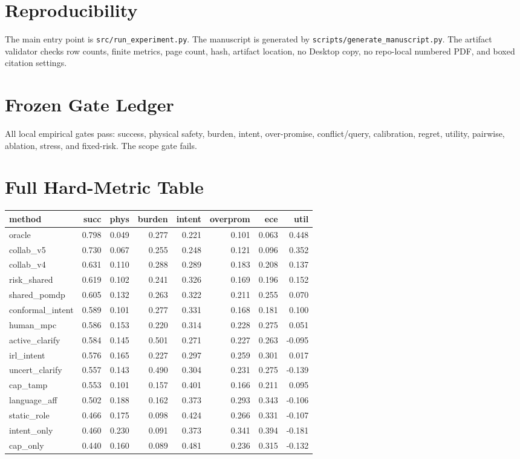 \documentclass{article}
\begin{document}
\section{Reproducibility}
The main entry point is \texttt{src/run\_experiment.py}. The manuscript is generated by \texttt{scripts/generate\_manuscript.py}. The artifact validator checks row counts, finite metrics, page count, hash, artifact location, no Desktop copy, no repo-local numbered PDF, and boxed citation settings.

\appendix
\section{Frozen Gate Ledger}
All local empirical gates pass: success, physical safety, burden, intent, over-promise, conflict/query, calibration, regret, utility, pairwise, ablation, stress, and fixed-risk. The scope gate fails.

\section{Full Hard-Metric Table}
\begingroup\scriptsize\setlength{\tabcolsep}{3pt}
\begin{longtable}{@{}lrrrrrrr@{}}
\toprule
method & succ & phys & burden & intent & overprom & ece & util \\
\midrule
oracle & 0.798 & 0.049 & 0.277 & 0.221 & 0.101 & 0.063 & 0.448 \\
collab\_v5 & 0.730 & 0.067 & 0.255 & 0.248 & 0.121 & 0.096 & 0.352 \\
collab\_v4 & 0.631 & 0.110 & 0.288 & 0.289 & 0.183 & 0.208 & 0.137 \\
risk\_shared & 0.619 & 0.102 & 0.241 & 0.326 & 0.169 & 0.196 & 0.152 \\
shared\_pomdp & 0.605 & 0.132 & 0.263 & 0.322 & 0.211 & 0.255 & 0.070 \\
conformal\_intent & 0.589 & 0.101 & 0.277 & 0.331 & 0.168 & 0.181 & 0.100 \\
human\_mpc & 0.586 & 0.153 & 0.220 & 0.314 & 0.228 & 0.275 & 0.051 \\
active\_clarify & 0.584 & 0.145 & 0.501 & 0.271 & 0.227 & 0.263 & -0.095 \\
irl\_intent & 0.576 & 0.165 & 0.227 & 0.297 & 0.259 & 0.301 & 0.017 \\
uncert\_clarify & 0.557 & 0.143 & 0.490 & 0.304 & 0.231 & 0.275 & -0.139 \\
cap\_tamp & 0.553 & 0.101 & 0.157 & 0.401 & 0.166 & 0.211 & 0.095 \\
language\_aff & 0.502 & 0.188 & 0.162 & 0.373 & 0.293 & 0.343 & -0.106 \\
static\_role & 0.466 & 0.175 & 0.098 & 0.424 & 0.266 & 0.331 & -0.107 \\
intent\_only & 0.460 & 0.230 & 0.091 & 0.373 & 0.341 & 0.394 & -0.181 \\
cap\_only & 0.440 & 0.160 & 0.089 & 0.481 & 0.236 & 0.315 & -0.132 \\
\bottomrule
\end{longtable}
\endgroup
\end{document}
